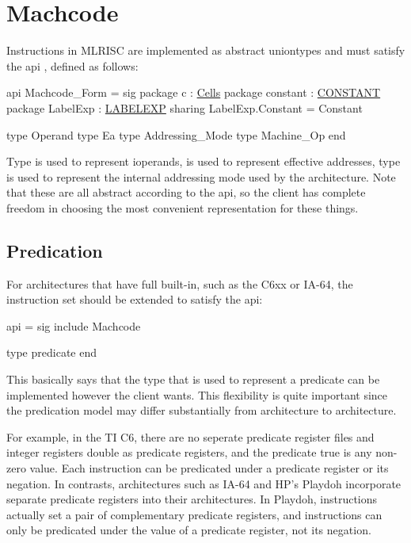 \section{Machcode}

  Instructions in MLRISC are implemented as abstract uniontypes and
must satisfy the api 
, defined as follows:

\begin{SML}
api Machcode_Form =
sig
   package c        : \href{cells.html}{Cells}
   package constant : \href{constants.html}{CONSTANT}
   package LabelExp : \href{labelexp.html}{LABELEXP}
      sharing LabelExp.Constant = Constant

   type Operand
   type Ea
   type Addressing_Mode
   type Machine_Op
end
\end{SML}

Type  is used to represent ioperands,
 is used to represent effective addresses, type 
 is used to represent the internal addressing mode
used by the architecture.  Note that these are all abstract according to 
the api, so the client has complete freedom in choosing the most
convenient representation for these things.

\subsection{Predication}
   For architectures that have full 
built-in, such as the C6xx or IA-64, the instruction set should be
extended to satisfy the api: 
\begin{SML}
api  =
sig
   include Machcode
   
   type predicate  
end
\end{SML}
This basically says that the type that is used to represent a predicate
can be implemented however the client wants.  This flexibility
is quite important since the predication model may differ substantially
from architecture to architecture.

For example, in the TI C6, there are no seperate predicate register files
and integer registers double as predicate registers, and the predicate
true is any non-zero value.  Each instruction can be predicated under a
predicate register or its negation.  In contrasts, architectures such as
IA-64 and HP's Playdoh incorporate separate predicate registers into their 
architectures.  In Playdoh,  instructions 
actually set a pair of complementary predicate registers, 
and instructions can only
be predicated under the value of a predicate register, not its negation.

